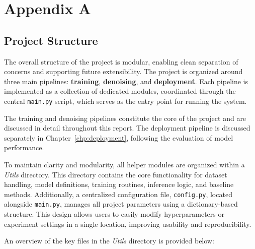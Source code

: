 \chapter{Appendix A}
\label{chp:appendix_a}

\section{Project Structure}
\label{sec:project_structure}
The overall structure of the project is modular, enabling clean separation of concerns and supporting future extensibility. The project is organized around three main pipelines: \textbf{training}, \textbf{denoising}, and \textbf{deployment}. Each pipeline is implemented as a collection of dedicated modules, coordinated through the central \texttt{main.py} script, which serves as the entry point for running the system.

The training and denoising pipelines constitute the core of the project and are discussed in detail throughout this report. The deployment pipeline is discussed separately in Chapter~\ref{chp:deployment}, following the evaluation of model performance.

To maintain clarity and modularity, all helper modules are organized within a \textit{Utils} directory. This directory contains the core functionality for dataset handling, model definitions, training routines, inference logic, and baseline methods. Additionally, a centralized configuration file, \texttt{config.py}, located alongside \texttt{main.py}, manages all project parameters using a dictionary-based structure. This design allows users to easily modify hyperparameters or experiment settings in a single location, improving usability and reproducibility.

An overview of the key files in the \textit{Utils} directory is provided below:

